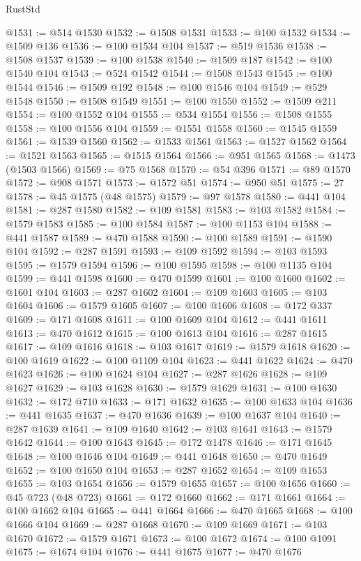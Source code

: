 \begin{lexlean}{RustStd}
\begin{coremodule}
@1531 := @514 @1530
@1532 := @1508 @1531
@1533 := @100 @1532
@1534 := @1509 @136
@1536 := @100 @1534 @104
@1537 := @519 @1536
@1538 := @1508 @1537
@1539 := @100 @1538
@1540 := @1509 @187
@1542 := @100 @1540 @104
@1543 := @524 @1542
@1544 := @1508 @1543
@1545 := @100 @1544
@1546 := @1509 @192
@1548 := @100 @1546 @104
@1549 := @529 @1548
@1550 := @1508 @1549
@1551 := @100 @1550
@1552 := @1509 @211
@1554 := @100 @1552 @104
@1555 := @534 @1554
@1556 := @1508 @1555
@1558 := @100 @1556 @104
@1559 := @1551 @1558
@1560 := @1545 @1559
@1561 := @1539 @1560
@1562 := @1533 @1561
@1563 := @1527 @1562
@1564 := @1521 @1563
@1565 := @1515 @1564
@1566 := @951 @1565
@1568 := @1473 (@1503 @1566)
@1569 := @75 @1568
@1570 := @54 @396
@1571 := @89 @1570
@1572 := @908 @1571
@1573 := @1572 @51
@1574 := @950 @51
@1575 := 27
@1578 := @45 @1575 (@48 @1575)
@1579 := @97 @1578
@1580 := @441 @104
@1581 := @287 @1580
@1582 := @109 @1581
@1583 := @103 @1582
@1584 := @1579 @1583
@1585 := @100 @1584
@1587 := @100 @1153 @104
@1588 := @441 @1587
@1589 := @470 @1588
@1590 := @100 @1589
@1591 := @1590 @104
@1592 := @287 @1591
@1593 := @109 @1592
@1594 := @103 @1593
@1595 := @1579 @1594
@1596 := @100 @1595
@1598 := @100 @1135 @104
@1599 := @441 @1598
@1600 := @470 @1599
@1601 := @100 @1600
@1602 := @1601 @104
@1603 := @287 @1602
@1604 := @109 @1603
@1605 := @103 @1604
@1606 := @1579 @1605
@1607 := @100 @1606
@1608 := @172 @337
@1609 := @171 @1608
@1611 := @100 @1609 @104
@1612 := @441 @1611
@1613 := @470 @1612
@1615 := @100 @1613 @104
@1616 := @287 @1615
@1617 := @109 @1616
@1618 := @103 @1617
@1619 := @1579 @1618
@1620 := @100 @1619
@1622 := @100 @1109 @104
@1623 := @441 @1622
@1624 := @470 @1623
@1626 := @100 @1624 @104
@1627 := @287 @1626
@1628 := @109 @1627
@1629 := @103 @1628
@1630 := @1579 @1629
@1631 := @100 @1630
@1632 := @172 @710
@1633 := @171 @1632
@1635 := @100 @1633 @104
@1636 := @441 @1635
@1637 := @470 @1636
@1639 := @100 @1637 @104
@1640 := @287 @1639
@1641 := @109 @1640
@1642 := @103 @1641
@1643 := @1579 @1642
@1644 := @100 @1643
@1645 := @172 @1478
@1646 := @171 @1645
@1648 := @100 @1646 @104
@1649 := @441 @1648
@1650 := @470 @1649
@1652 := @100 @1650 @104
@1653 := @287 @1652
@1654 := @109 @1653
@1655 := @103 @1654
@1656 := @1579 @1655
@1657 := @100 @1656
@1660 := @45 @723 (@48 @723)
@1661 := @172 @1660
@1662 := @171 @1661
@1664 := @100 @1662 @104
@1665 := @441 @1664
@1666 := @470 @1665
@1668 := @100 @1666 @104
@1669 := @287 @1668
@1670 := @109 @1669
@1671 := @103 @1670
@1672 := @1579 @1671
@1673 := @100 @1672
@1674 := @100 @1091
@1675 := @1674 @104
@1676 := @441 @1675
@1677 := @470 @1676

\end{coremodule}
\end{lexlean}

